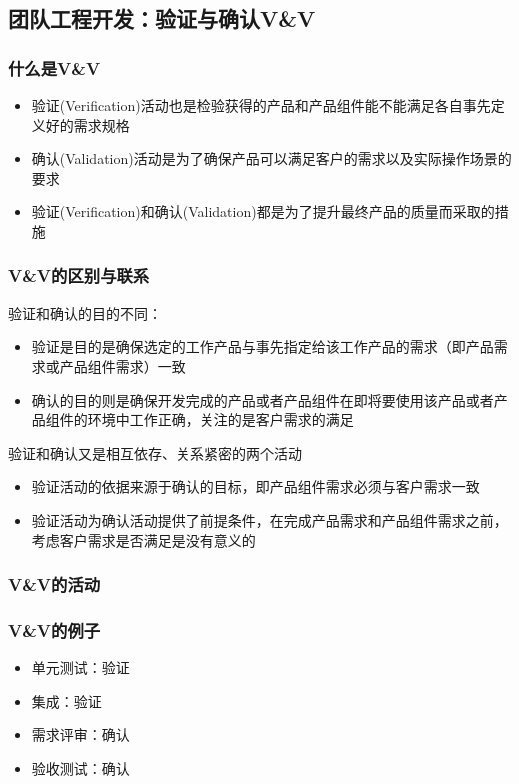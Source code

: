 \subsection{团队工程开发：验证与确认V\&V}

\subsubsection{什么是V\&V}
\begin{itemize}
    \item 验证(Verification)活动也是检验获得的产品和产品组件能不能满足各自事先定义好的需求规格
    \item 确认(Validation)活动是为了确保产品可以满足客户的需求以及实际操作场景的要求
    \item 验证(Verification)和确认(Validation)都是为了提升最终产品的质量而采取的措施
\end{itemize}

\subsubsection{V\&V的区别与联系}
验证和确认的目的不同：
\begin{itemize}
    \item 验证是目的是确保选定的工作产品与事先指定给该工作产品的需求（即产品需求或产品组件需求）一致
    \item 确认的目的则是确保开发完成的产品或者产品组件在即将要使用该产品或者产品组件的环境中工作正确，关注的是客户需求的满足
\end{itemize}

验证和确认又是相互依存、关系紧密的两个活动
\begin{itemize}
    \item 验证活动的依据来源于确认的目标，即产品组件需求必须与客户需求一致
    \item 验证活动为确认活动提供了前提条件，在完成产品需求和产品组件需求之前，考虑客户需求是否满足是没有意义的
\end{itemize}

\subsubsection{V\&V的活动}


\subsubsection{V\&V的例子}
\vspace{-0.8em}
\begin{multicols}{4}
    \begin{itemize}
        \item 单元测试：验证
        \item 集成：验证
        \item 需求评审：确认
        \item 验收测试：确认
    \end{itemize}
\end{multicols}
\vspace{-1em}

